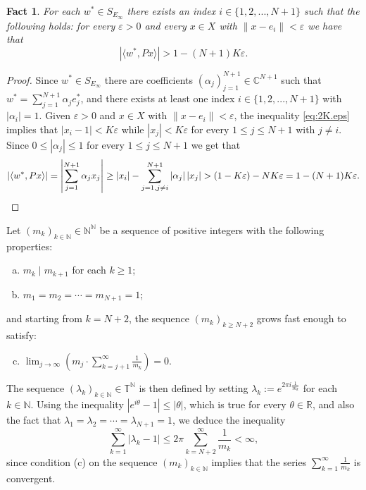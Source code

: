 \documentclass[openright,11pt]{article}
\theoremstyle{plain}
\newtheorem{fact}{Fact}[subsection]
\theoremstyle{definition}
\newcommand{\NN}{\mathbb{N}}
\newcommand{\RR}{\mathbb{R}}
\newcommand{\CC}{\mathbb{C}}
\newcommand{\TT}{\mathbb{T}}
\newcommand{\eps}{\varepsilon}
\newcommand{\ep}[2]{\langle #1 , #2 \rangle}
\begin{document}
\begin{fact}\label{Fact:find.i}
	For each $w^* \in S_{E_{\infty}}$ there exists an index $i \in \{1,2,...,N+1\}$ such that the following holds: for every $\eps>0$ and every $x \in X$ with $\|x-e_i\|<\eps$ we have that
	\[
	\left|\ep{w^*}{Px}\right| > 1 - (N+1)K\eps.
	\]
\end{fact}
\begin{proof}
	Since $w^* \in S_{E_{\infty}}$ there are coefficients $(\alpha_j)_{j=1}^{N+1} \in \CC^{N+1}$ such that $w^* = \sum_{j=1}^{N+1} \alpha_j e_j^*$, and there exists at least one index $i \in \{1,2,...,N+1\}$ with $|\alpha_i|=1$. Given $\eps>0$ and $x \in X$ with $\| x - e_i \| < \eps$, the inequality \eqref{eq:2K.eps} implies that $|x_i-1|<K\eps$ while $|x_j|<K\eps$ for every $1\leq j\leq N+1$ with $j\neq i$. Since $0 \leq |\alpha_j| \leq 1$ for every $1\leq j\leq N+1$ we get that
	\[
	\left|\ep{w^*}{Px}\right| = \left| \sum_{j=1}^{N+1} \alpha_j x_j \right| \geq \left|x_i\right| - \sum_{j=1,j\neq i}^{N+1} |\alpha_j| \left|x_j\right| > (1-K\eps) - NK\eps = 1 - (N+1)K\eps.\qedhere
	\]
\end{proof}


Let $(m_k)_{k\in\NN} \in \NN^{\NN}$ be a sequence of positive integers with the following properties:
\begin{enumerate}[(a)]
	\item $m_k \mid m_{k+1}$ for each $k \geq 1$;
	
	\item $m_1 = m_2 = \cdots = m_{N+1} = 1$;
\end{enumerate}
and starting from $k=N+2$, the sequence $(m_k)_{k\geq N+2}$ grows fast enough to satisfy:
\begin{enumerate}[(a)]
	\setcounter{enumi}{2}
	\item $\displaystyle \lim_{j\to\infty} \textstyle \left(m_j \cdot \sum_{k=j+1}^{\infty} \frac{1}{m_k} \right) = 0$.
\end{enumerate}
The sequence $(\lambda_k)_{k\in\NN} \in \TT^{\NN}$ is then defined by setting $\lambda_k := e^{2\pi i \frac{1}{m_k}}$ for each $k \in \NN$. Using the inequality $|e^{i\theta}-1| \leq |\theta|$, which is true for every $\theta \in \RR$, %
and also the fact that $\lambda_1=\lambda_2=\cdots=\lambda_{N+1}=1$, we deduce the inequality
\begin{equation}\label{eq:sum.lambda_k-1}
	\sum_{k=1}^{\infty} |\lambda_k-1| \leq 2\pi \sum_{k=N+2}^{\infty} \frac{1}{m_k} < \infty,
\end{equation}
since condition (c) on the sequence $(m_k)_{k\in\NN}$ implies that the series $\sum_{k=1}^{\infty} \frac{1}{m_k}$ is convergent.
\end{document}
